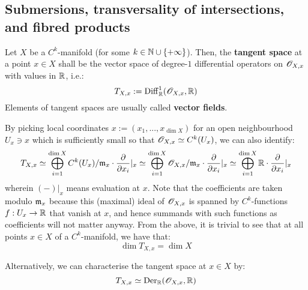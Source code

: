     \subsection{Submersions, transversality of intersections, and fibred products}
        \begin{definition} \label{def: tangent_spaces}
            Let $X$ be a $C^k$-manifold (for some $k \in \mathbb{N} \cup \{+\infty\}$). Then, the \textbf{tangent space} at a point $x \in X$ shall be the vector space of degree-$1$ differential operators on $\mathscr{O}_{X, x}$ with values in $\mathbb{R}$, i.e.:
                $$T_{X, x} := \mathrm{Diff}^1_{\mathbb{R}}( \mathscr{O}_{X, x}, \mathbb{R} )$$
            Elements of tangent spaces are usually called \textbf{vector fields}.
        \end{definition}
        By picking local coordinates $x := (x_1, ..., x_{\dim X})$ for an open neighbourhood $U_x \ni x$ which is sufficiently small so that $\mathscr{O}_{X, x} \simeq C^k(U_x)$, we can also identify:
            $$T_{X, x} \simeq \bigoplus_{i = 1}^{\dim X} C^k(U_x)/\mathfrak{m}_x \cdot \frac{\partial}{\partial x_i} |_x \simeq \bigoplus_{i = 1}^{\dim X} \mathscr{O}_{X, x}/\mathfrak{m}_x \cdot \frac{\partial}{\partial x_i} |_x \simeq \bigoplus_{i = 1}^{\dim X} \mathbb{R} \cdot \frac{\partial}{\partial x_i} |_x$$
        wherein $(-) |_x$ means evaluation at $x$. Note that the coefficients are taken modulo $\mathfrak{m}_x$ because this (maximal) ideal of $\mathscr{O}_{X, x}$ is spanned by $C^k$-functions $f: U_x \to \mathbb{R}$ that vanish at $x$, and hence summands with such functions as coefficients will not matter anyway. From the above, it is trivial to see that at all points $x \in X$ of a $C^k$-manifold, we have that:
            $$\dim T_{X, x} = \dim X$$

        Alternatively, we can characterise the tangent space at $x \in X$ by:
            $$T_{X, x} \simeq \mathrm{Der}_{\mathbb{R}}(\mathscr{O}_{X, x}, \mathbb{R})$$


